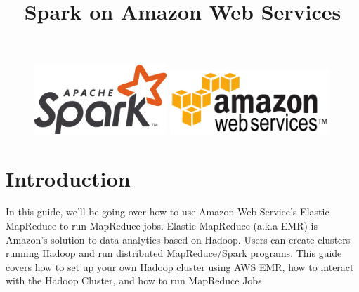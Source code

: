 \documentclass{article}
\title{Spark on Amazon Web Services} %
\date{\vspace{-8ex}} %
\begin{document}
\maketitle %


\begin{figure}[h!]
 \centering
 \includegraphics[width=50mm]{images/Apache_Spark_logo.png}\hspace{15mm}
 \includegraphics[width=60mm]{images/AWS}
\end{figure} 


\section*{Introduction} %

In this guide, we'll be going over how to use Amazon Web Service's Elastic MapReduce to run MapReduce jobs. Elastic MapReduce (a.k.a EMR) is Amazon's solution to data analytics based on Hadoop. Users can create clusters running Hadoop and run distributed MapReduce/Spark programs. This guide covers how to set up your own Hadoop cluster using AWS EMR, how to interact with the Hadoop Cluster, and how to run MapReduce Jobs.


\hypersetup{hidelinks}
\tableofcontents

\end{document}
